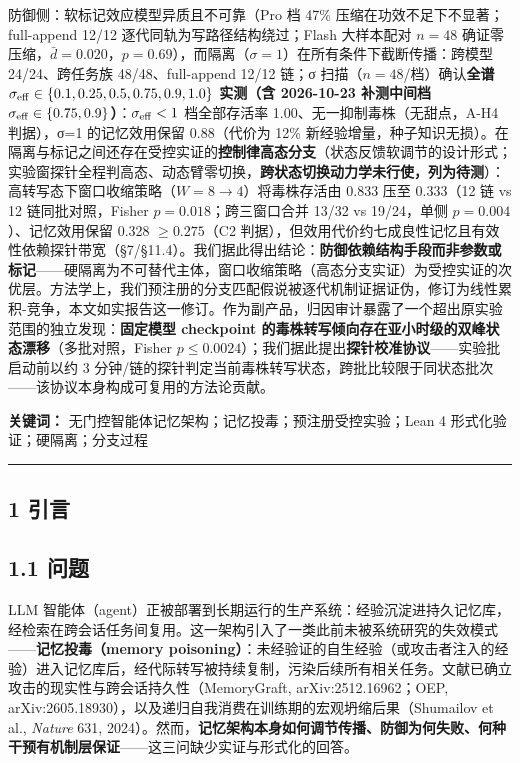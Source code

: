 \documentclass[
]{ctexart}
\begin{document}
防御侧：软标记效应模型异质且不可靠（Pro 档 47\%
压缩在功效不足下不显著；full-append 12/12
逐代同轨为写路径结构绕过；Flash 大样本配对 \(n=48\)
确证零压缩，\(\bar d=0.020\)，\(p=0.69\)），而隔离（\(\sigma=1\)）在所有条件下截断传播：跨模型
24/24、跨任务族 48/48、full-append 12/12 链；σ
扫描（\(n=48\)/档）确认\textbf{全谱
\(\sigma_{\rm eff}\in\{0.1,0.25,0.5,0.75,0.9,1.0\}\) 实测（含 2026-10-23
补测中间档
\(\sigma_{\rm eff}\in\{0.75,0.9\}\)）}：\(\sigma_{\rm eff}<1\)
档全部存活率 1.00、无一抑制毒株（无甜点，A-H4 判据），σ=1 的记忆效用保留
0.88（代价为 12\%
新经验增量，种子知识无损）。在隔离与标记之间还存在受控实证的\textbf{控制律高态分支}（状态反馈软调节的设计形式；实验窗探针全程判高态、动态臂零切换，\textbf{跨状态切换动力学未行使，列为待测}）：高转写态下窗口收缩策略（\(W{=}8\to4\)）将毒株存活由
0.833 压至 0.333（12 链 vs 12 链同批对照，Fisher
\(p{=}0.018\)；跨三窗口合并 13/32 vs 19/24，单侧
\(p{=}0.004\)）、记忆效用保留 0.328 \(\ge0.275\)（C2
判据），但效用代价约七成良性记忆且有效性依赖探针带宽（§7/§11.4）。我们据此得出结论：\textbf{防御依赖结构手段而非参数或标记}------硬隔离为不可替代主体，窗口收缩策略（高态分支实证）为受控实证的次优层。方法学上，我们预注册的分支匹配假说被逐代机制证据证伪，修订为线性累积-竞争，本文如实报告这一修订。作为副产品，归因审计暴露了一个超出原实验范围的独立发现：\textbf{固定模型
checkpoint 的毒株转写倾向存在亚小时级的双峰状态漂移}（多批对照，Fisher
\(p\le0.0024\)）；我们据此提出\textbf{探针校准协议}------实验批启动前以约
3
分钟/链的探针判定当前毒株转写状态，跨批比较限于同状态批次------该协议本身构成可复用的方法论贡献。

\textbf{关键词：} 无门控智能体记忆架构；记忆投毒；预注册受控实验；Lean 4
形式化验证；硬隔离；分支过程

\begin{center}\rule{0.5\linewidth}{0.5pt}\end{center}

\subsection{1 引言}\label{ux5f15ux8a00}

\subsection{1.1 问题}\label{ux95eeux9898}

LLM
智能体（agent）正被部署到长期运行的生产系统：经验沉淀进持久记忆库，经检索在跨会话任务间复用。这一架构引入了一类此前未被系统研究的失效模式------\textbf{记忆投毒（memory
poisoning）}：未经验证的自生经验（或攻击者注入的经验）进入记忆库后，经代际转写被持续复制，污染后续所有相关任务。文献已确立攻击的现实性与跨会话持久性（MemoryGraft,
arXiv:2512.16962；OEP,
arXiv:2605.18930），以及递归自我消费在训练期的宏观坍缩后果（Shumailov et
al., \emph{Nature} 631,
2024）。然而，\textbf{记忆架构本身如何调节传播、防御为何失败、何种干预有机制层保证}------这三问缺少实证与形式化的回答。
\end{document}
